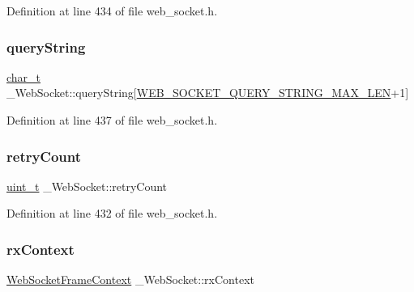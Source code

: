Definition at line 434 of file web\+\_\+socket.\+h.

\mbox{\label{struct__WebSocket_a8cc5673e4aec46c4798cc72116b49ac3}} 
\subsubsection{\texorpdfstring{query\+String}{queryString}}
{\footnotesize\ttfamily \hyperlink{compiler__port_8h_a40bb5262bf908c328fbcfbe5d29d0201}{char\+\_\+t} \+\_\+\+Web\+Socket\+::query\+String\mbox{[}\hyperlink{web__socket_8h_aa438876c03fc0dc137c3aaedc4a3071d}{W\+E\+B\+\_\+\+S\+O\+C\+K\+E\+T\+\_\+\+Q\+U\+E\+R\+Y\+\_\+\+S\+T\+R\+I\+N\+G\+\_\+\+M\+A\+X\+\_\+\+L\+EN}+1\mbox{]}}



Definition at line 437 of file web\+\_\+socket.\+h.

\mbox{\label{struct__WebSocket_a35ff726c380bf014810fa42fa0df10eb}} 
\subsubsection{\texorpdfstring{retry\+Count}{retryCount}}
{\footnotesize\ttfamily \hyperlink{compiler__port_8h_a12a1e9b3ce141648783a82445d02b58d}{uint\+\_\+t} \+\_\+\+Web\+Socket\+::retry\+Count}



Definition at line 432 of file web\+\_\+socket.\+h.

\mbox{\label{struct__WebSocket_a78fece10de79b7449bc362195f10baeb}} 
\subsubsection{\texorpdfstring{rx\+Context}{rxContext}}
{\footnotesize\ttfamily \hyperlink{structWebSocketFrameContext}{Web\+Socket\+Frame\+Context} \+\_\+\+Web\+Socket\+::rx\+Context}



